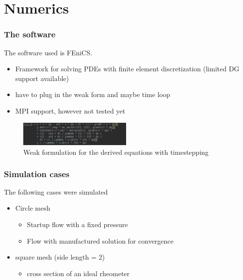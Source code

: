 \documentclass[12pt,a4paper,handout]{beamer}
\theoremstyle{definition}
\theoremstyle{plain}
\begin{document}
\section{Numerics}
\begin{frame}
    \frametitle{The software}
    The software used is FEniCS. 
    \begin{itemize}[<+->]
        \item Framework for solving PDEs with finite element discretization (limited DG support available)
        \item have to plug in the weak form and maybe time loop
        \item MPI support, however not tested yet 
    \end{itemize}
    \begin{figure}
        \includegraphics[width=0.5\textwidth]{FenicsCode}
        \caption{Weak formulation for the derived equations with timestepping}
    \end{figure}
\end{frame}
\begin{frame}
\frametitle{Simulation cases}
The following cases were simulated
\begin{itemize}[<+->]
    \item Circle mesh 
    \begin{itemize}[<+->]
        \item Startup flow with a fixed pressure 
        \item Flow with manufactured solution for convergence
    \end{itemize}
    \item square mesh (side length = 2)
    \begin{itemize}[<+->]
        \item cross section of an ideal rheometer
    \end{itemize}
\end{itemize}
\end{frame}
\end{document}
